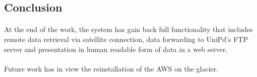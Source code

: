 \subsection{Conclusion}
\paragraph{}At the end of the work, the system has gain back full functionality
that includes remote data retrieval via satellite connection, data forwarding
to UniPd's FTP server and presentation in human readable form of data
in a web server.
\paragraph{}Future work has in view the reinstallation of the AWS on the glacier.
